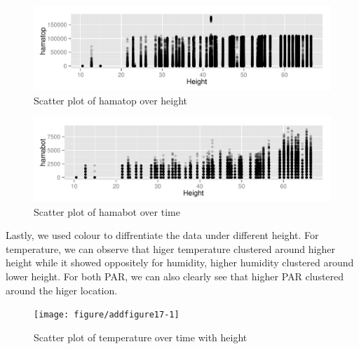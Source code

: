 \documentclass{article}\usepackage[]{graphicx}\usepackage[]{color}
\makeatletter
\def\maxwidth{ %
  \ifdim\Gin@nat@width>\linewidth
    \linewidth
  \else
    \Gin@nat@width
  \fi
}
\newenvironment{knitrout}{}{} %
\makeatother
\begin{document}
\begin{knitrout}
\color{fgcolor}\begin{figure}[h!]

{\centering \includegraphics[width=\maxwidth]{figure/addfigure15-1} 

}

\caption[Scatter plot of hamatop over height]{Scatter plot of hamatop over height}\label{fig:addfigure15}
\end{figure}


\end{knitrout}


\begin{knitrout}
\color{fgcolor}\begin{figure}[h!]

{\centering \includegraphics[width=\maxwidth]{figure/addfigure16-1} 

}

\caption[Scatter plot of hamabot over time]{Scatter plot of hamabot over time}\label{fig:addfigure16}
\end{figure}


\end{knitrout}

Lastly, we used colour to diffrentiate the data under different height. For temperature, we can observe that
higer temperature clustered around higher height while it showed oppositely for humidity, higher humidity clustered around lower height. For both PAR, we can also clearly see that higher PAR clustered around the higer location.
\begin{knitrout}
\color{fgcolor}\begin{figure}[h!]

{\centering \texttt{[image: figure/addfigure17-1]} 

}

\caption[Scatter plot of temperature over time with height]{Scatter plot of temperature over time with height}\label{fig:addfigure17}
\end{figure}


\end{knitrout}
\end{document}
